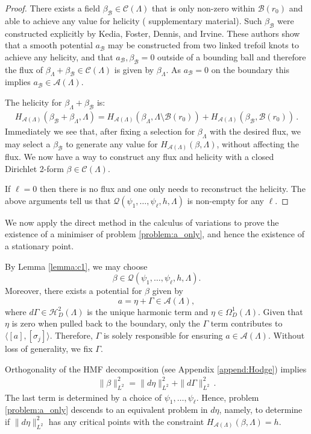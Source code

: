 \documentclass[11pt]{article}
\theoremstyle{plain}
\theoremstyle{definition}
\theoremstyle{remark}
\newcommand{\B}{\mathcal{B}}
\newcommand{\ST}{\Lambda}
\begin{document}
\begin{proof}
 There exists a field \(\beta _\B \in \mathcal{C}(\ST)\) that is only non-zero within \(\B(r_0)\) and able to achieve any value for helicity (\cite{PhysRevLett.117.274501} supplementary material). Such \(\beta _\B\) were constructed explicitly by Kedia, Foster, Dennis, and Irvine. These authors show that a smooth potential \(a_\B\) may be constructed from two linked trefoil knots to achieve any helicity, and that \(a_\B, \beta _\B = 0\) outside of a bounding ball and therefore the flux of \(\beta _{\ST} + \beta _\B \in \mathcal{C}(\ST)\) is given by \(\beta _{\ST}\). As \(a_\B = 0\) on the boundary this implies \(a_\B \in \mathscr{A}(\ST)\). 

The helicity for \(\beta _{\ST} + \beta _\B\) is:
\begin{align*}
    H_{\mathscr{A}(\ST)}( \beta_\B + \beta_\ST , \ST) = H_{\mathscr{A}(\ST)} (\beta_\ST , \ST \setminus \B(r_0) ) +  H_{\mathscr{A}(\ST)} ( \beta_\B , \B(r_0) ) \, .
\end{align*}
Immediately we see that, after fixing a selection for \({\beta}_\ST\) with the desired flux, we may select a \(  \beta_\B \) to generate any value for \(H_{\mathscr{A}(\ST)}(\beta , \ST) \), without affecting the flux. We now have a way to construct any flux and helicity with a closed Dirichlet 2-form \(\beta  \in \mathcal{C} (\ST)\).



If \(\ell = 0\) then there is no flux and one only needs to reconstruct the helicity. The above arguments tell us that \(\mathscr{Q}( \psi_1, \dots, \psi_\ell , h, \ST )\) is non-empty for any \(\ell\). 
\end{proof}


We now apply the direct method in the calculus of variations to prove the existence of a minimiser of problem \ref{problem:a_only}, and hence the existence of a stationary point.

By Lemma \ref{lemma:c1}, we may choose
\[
\beta \in \mathscr{Q}(\psi_1,\dots,\psi_\ell,h,\ST).
\]
Moreover, there exists a potential for \(\beta\) given by
\[
a=\eta+\Gamma \in \mathscr{A}(\ST),
\]
where \(d\Gamma \in \mathcal{H}^2_D (\ST)\) is the unique harmonic term and \(\eta \in \Omega^1_D(\ST)\). Given that \(\eta\) is zero when pulled back to the boundary, only the \(\Gamma\) term contributes to \(\langle [a], [\sigma_j]\rangle\). Therefore, \(\Gamma\) is solely responsible for ensuring \(a \in \mathscr{A}(\ST)\). Without loss of generality, we fix \(\Gamma\). 


Orthogonality of the HMF decomposition (see Appendix \ref{append:Hodge}) implies 
\begin{align*}
    \| \beta  \|_{L^2}^2 = \|d \eta \|_{L^2}^2 + \| d \Gamma \|_{L^2}^2 \, .
\end{align*}
The last term is determined by a choice of \(\psi_1, \dots, \psi_\ell\). Hence, problem \ref{problem:a_only} descends to an equivalent problem in \(d \eta\), namely, to determine if \(\|d \eta \|_{L^2}^2\) has any critical points with the constraint \(H_{\mathscr{A}(\ST)}( \beta , \ST) = h\).
\end{document}
